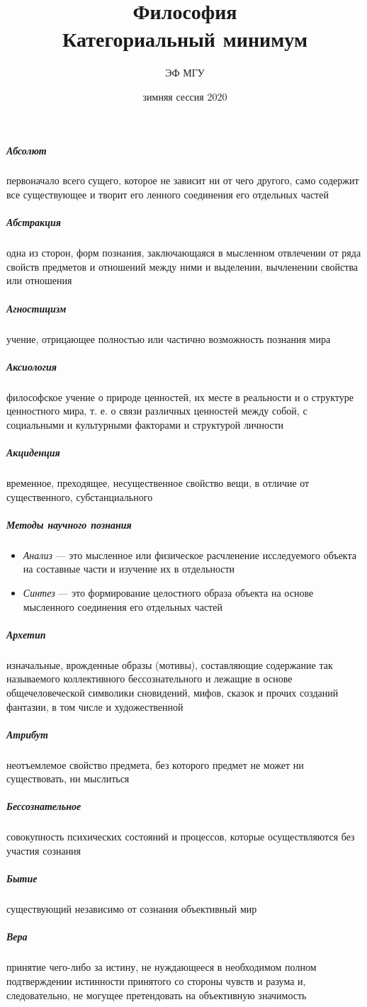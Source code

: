 \documentclass[a4paper, 12pt]{article}
\title{Философия \\ Категориальный минимум}
\author{ЭФ МГУ}
\date{зимняя сессия 2020}
\theoremstyle{plain} %
\theoremstyle{definition} %
\theoremstyle{remark} %
\begin{document}
\maketitle

\subparagraph{Абсолют}
    первоначало всего сущего, которое не зависит ни от чего другого, само содержит все существующее и творит его ленного соединения его отдельных частей

\subparagraph{Абстракция}
    одна из сторон, форм познания, заключающаяся в мысленном отвлечении от ряда свойств предметов и отношений между ними и выделении, вычленении свойства или отношения

\subparagraph{Агностицизм}
    учение, отрицающее полностью или частично возможность познания мира

\subparagraph{Аксиология}
    философское учение о природе ценностей, их месте в реальности и о структуре ценностного мира, т. е. о связи различных ценностей между собой, с социальными и культурными факторами и структурой личности

\subparagraph{Акциденция}
    временное, преходящее, несущественное свойство вещи, в отличие от существенного, субстанциального

\subparagraph{Методы научного познания}
    \begin{itemize}
        \item[] \emph{Анализ} --- это мысленное или физическое расчленение исследуемого объекта на составные части и изучение их в отдельности
         \item[] \emph{Синтез} --- это формирование целостного образа объекта на основе мысленного соединения его отдельных частей
    \end{itemize}

\subparagraph{Архетип}
    изначальные, врожденные образы (мотивы), составляющие содержание так называемого коллективного бессознательного и лежащие в основе общечеловеческой символики сновидений, мифов, сказок и прочих созданий фантазии, в том числе и художественной

\subparagraph{Атрибут}
    неотъемлемое свойство предмета, без которого предмет не может ни существовать, ни мыслиться

\subparagraph{Бессознательное}
    совокупность психических состояний и процессов, которые осуществляются без участия сознания

\subparagraph{Бытие}
    существующий независимо от сознания объективный мир

\subparagraph{Вера}
    принятие чего-либо за истину, не нуждающееся в необходимом полном подтверждении истинности принятого со стороны чувств и разума и, следовательно, не могущее претендовать на объективную значимость
\end{document}
